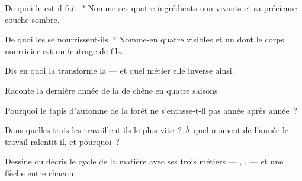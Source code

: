 \begin{exercise}[$\star$]\label{exo:g6:decomposers-and-soil:1}
De quoi le  est-il fait~? Nomme ses quatre ingrédients non
vivants et sa précieuse couche sombre.
\end{exercise}

\begin{exercise}[$\star$]\label{exo:g6:decomposers-and-soil:2}
De quoi les  se nourrissent-ils~? Nomme-en quatre
visibles et un dont le corps nourricier est un feutrage de fils.
\end{exercise}

\begin{exercise}[$\star$]\label{exo:g6:decomposers-and-soil:3}
Dis en quoi la  transforme la  --- et
quel métier elle inverse ainsi.
\end{exercise}

\begin{exercise}[$\star$]\label{exo:g6:decomposers-and-soil:4}
Raconte la dernière année de la  de chêne en quatre saisons.
\end{exercise}

\begin{exercise}[$\star$]\label{exo:g6:decomposers-and-soil:5}
Pourquoi le tapis d'automne de la forêt ne s'entasse-t-il pas année
après année~?
\end{exercise}

\begin{exercise}[$\star$]\label{exo:g6:decomposers-and-soil:6}
Dans quelles trois  les  travaillent-ils le
plus vite~? À quel moment de l'année le travail ralentit-il, et
pourquoi~?
\end{exercise}

\begin{exercise}[$\star\star$]\label{exo:g6:decomposers-and-soil:7}
Dessine ou décris le cycle de la matière avec ses trois métiers ---
, ,  --- et une flèche entre
chacun.
\end{exercise}


